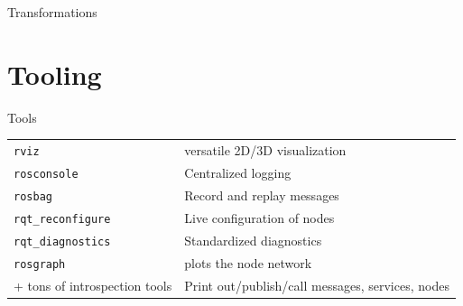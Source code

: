 \documentclass[compress]{beamer}
\begin{document}
\begin{frame}{Transformations}
%    
 {
    \begin{center}
    
    \end{center}
}
\end{frame}

\section{Tooling}

\begin{frame}{Tools}
    \begin{table}[]
        \begin{tabularx}{\linewidth}{l>{\raggedright}X}
            \toprule
            \texttt{rviz} & versatile 2D/3D visualization \tabularnewline
            \texttt{rosconsole} & Centralized logging \tabularnewline
            \texttt{rosbag} & Record and replay messages \tabularnewline
            \texttt{rqt\_reconfigure} & Live configuration of nodes \tabularnewline
            \texttt{rqt\_diagnostics} & Standardized diagnostics \tabularnewline
            \texttt{rosgraph} & plots the node network \tabularnewline
            + tons of introspection tools & Print out/publish/call messages, services, nodes \tabularnewline
            \bottomrule
        \end{tabularx}
        \label{tab:options}
    \end{table}
\end{frame}
\end{document}
